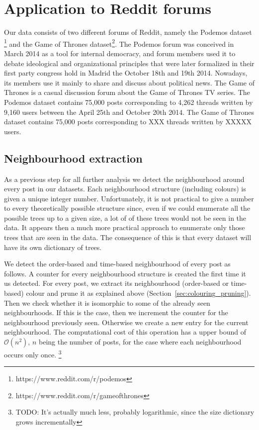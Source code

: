 \documentclass[conference]{IEEEtran}
\begin{document}
\section{Application to Reddit forums}
Our data consists of two different forums of Reddit, namely the Podemos dataset \footnote{https://www.reddit.com/r/podemos} and the Game of Thrones dataset\footnote{https://www.reddit.com/r/gameofthrones}. The Podemos forum was conceived in March 2014 as a tool for internal democracy, and forum members used it to debate ideological and organizational principles that were later formalized in their first party congress hold in Madrid the October 18th and 19th 2014. Nowadays, its members use it mainly to share and discuss about political news. The Game of Thrones is a casual discussion forum about the Game of Thrones TV series.
The Podemos dataset contains 75,000 posts corresponding to 4,262 threads written by 9,160 users between the April 25th and October 20th 2014. The Game of Thrones dataset contains 75,000 posts corresponding to XXX threads written by XXXXX users.

\subsection{Neighbourhood extraction}
As a previous step for all further analysis we detect the neighbourhood around every post in our datasets. Each neighbourhood structure (including colours) is given a unique integer number. Unfortunately, it is not practical to give a number to every theoretically possible structure since, even if we could enumerate all the possible trees up to a given size, a lot of of these trees would not be seen in the data. It appears then a much more practical approach to enumerate only those trees that are seen in the data. The consequence of this is that every dataset will have its own dictionary of trees. 

We detect the order-based and time-based neighbourhood of every post as follows. A counter for every neighbourhood structure is created the first time it us detected. For every post, we extract its neighbourhood (order-based or time-based) colour and prune it as explained above (Section~\ref{sec:colouring_pruning}). Then we check whether it is isomorphic to some of the already seen neighbourhoods. If this is the case, then we increment the counter for the neighbourhood previously seen. Otherwise we create a new entry for the current neighbourhood. The computational cost of this operation has a upper bound of $\mathcal O(n^2)$, $n$ being the number of posts, for the case where each neighbourhood occurs only once. \footnote{TODO: It's actually much less, probably logarithmic, since the size dictionary grows incrementally}
\end{document}
